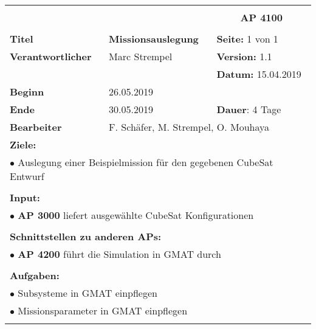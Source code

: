 \clearpage
\begin{table}[!h]
 \begin{center}
  \begin{tabular}{|p{35mm}||p{55mm}|p{50mm}||p{40mm}|}
   \hline
   \multicolumn{3}{|l||}{\textbf{}} & \multicolumn{1}{c|}{}\\
   \multicolumn{3}{|l||}{\textbf{}} & \multicolumn{1}{c|}{\textbf{AP 4100}}\\
   \multicolumn{3}{|l||}{\textbf{}} & \multicolumn{1}{c|}{}\\
   \hline\hline
   \textbf{Titel} & \multicolumn{2}{p{7cm}||}{\textbf{Missionsauslegung}} & \textbf{Seite:} 1 von 1\\
   \hline
   \textbf{Verantwortlicher} & \multicolumn{2}{l||}{Marc Strempel} & \textbf{Version:} 1.1\\
   \hline
   \multicolumn{3}{|l||}{} & \textbf{Datum:} 15.04.2019\\
   \hline\hline
   \textbf{Beginn} & \multicolumn{2}{l||}{26.05.2019} & \\
   \hline
   \textbf{Ende} & \multicolumn{2}{l||}{30.05.2019} & \textbf{Dauer}: 4 Tage\\
   \hline\hline
   \textbf{Bearbeiter} & \multicolumn{3}{l|}{F. Schäfer, M. Strempel, O. Mouhaya}\\
   \hline\hline
   \multicolumn{4}{|p{150mm}|}{\textbf{Ziele:}}\\
   \multicolumn{4}{|p{150mm}|}{$\bullet$ Auslegung einer Beispielmission für den gegebenen CubeSat Entwurf}\\
   \multicolumn{4}{|p{150mm}|}{}\\
   \multicolumn{4}{|p{150mm}|}{\textbf{Input:}}\\
   \multicolumn{4}{|p{150mm}|}{$\bullet$ \textbf{AP 3000} liefert ausgewählte CubeSat Konfigurationen}\\
   \multicolumn{4}{|p{150mm}|}{}\\
   \multicolumn{4}{|p{150mm}|}{\textbf{Schnittstellen zu anderen APs:}}\\
   \multicolumn{4}{|p{150mm}|}{$\bullet$ \textbf{AP 4200} führt die Simulation in GMAT durch}\\
   \multicolumn{4}{|p{150mm}|}{}\\
   \multicolumn{4}{|p{150mm}|}{\textbf{Aufgaben:}}\\
   \multicolumn{4}{|p{150mm}|}{$\bullet$ Subsysteme in GMAT einpflegen}\\
   \multicolumn{4}{|p{150mm}|}{$\bullet$ Missionsparameter in GMAT einpflegen}\\
   \multicolumn{4}{|p{150mm}|}{}\\
   \hline
  \end{tabular}
 \end{center}
\end{table}

